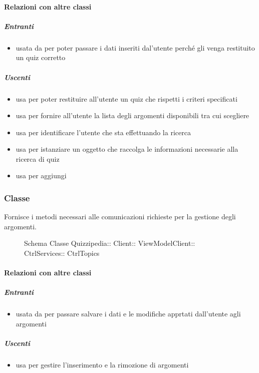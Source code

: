 \paragraph{Relazioni con altre classi}
\subparagraph{Entranti}
\begin{itemize}
\item usata da  per poter passare i dati inseriti dal'utente perché gli venga restituito un quiz corretto
\end{itemize}
\subparagraph{Uscenti}
\begin{itemize}
\item usa  per poter restituire all'utente un quiz che rispetti i criteri specificati
\item usa  per fornire all'utente la lista degli argomenti disponibili tra cui scegliere
\item usa  per identificare l'utente che sta effettuando la ricerca
\item usa  per istanziare un oggetto che raccolga le informazioni necessarie alla ricerca di quiz
\item usa  per aggiungi
\end{itemize}
\subsubsection{Classe }
Fornisce i metodi necessari alle comunicazioni richieste per la gestione degli argomenti.
\begin{figure}[H]
\centering
\noindent{}
\caption[Schema Classe CtrlTopics]{Schema Classe Quizzipedia:: Client:: ViewModelClient:: CtrlServices:: CtrlTopics}
\end{figure}
\paragraph{Relazioni con altre classi}
\subparagraph{Entranti}
\begin{itemize}
\item usata da  per passare salvare i dati e le modifiche apprtati dall'utente agli argomenti
\end{itemize}
\subparagraph{Uscenti}
\begin{itemize}
\item usa  per gestire l'inserimento e la rimozione di argomenti
\end{itemize}
